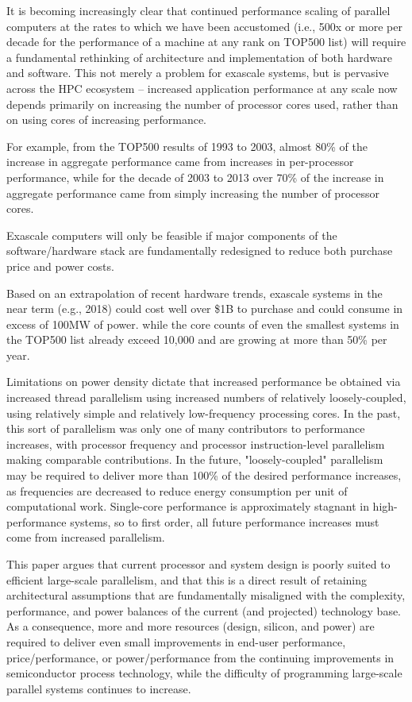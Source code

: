 It is becoming increasingly clear that continued performance scaling of 
parallel computers at the rates to which we have been accustomed (i.e., 500x or more
per decade for the performance of a machine at any rank on TOP500 list) will
require a fundamental rethinking of architecture and implementation of 
both hardware and software.   This not merely a problem for exascale systems,
but is pervasive across the HPC ecosystem -- increased application performance at
any scale now depends primarily on increasing the number of processor cores used,
rather than on using cores of increasing performance.


For example, from the TOP500 results of 1993 to 2003, 
almost 80\% of the increase in aggregate performance came from increases in per-processor 
performance, while for the decade of 2003 to 2013 over 70\% of the increase in aggregate
performance came from simply increasing the number of processor cores.

Exascale computers will only be
feasible if major components of the software/hardware stack are fundamentally
redesigned to reduce both purchase price and power costs.

Based on an extrapolation of recent hardware trends, exascale systems in 
the near term (e.g., 2018) could cost well over \$1B to purchase and could 
consume in excess of 100MW of power.  
while the core counts of even the 
smallest systems in the TOP500 list already exceed 10,000 and are growing
at more than 50\% per year.

Limitations on power density dictate that increased performance be obtained via 
increased thread parallelism %
using increased numbers of relatively loosely-coupled, 
using relatively simple and relatively low-frequency processing cores. 
In the past, this sort of parallelism was only 
one of many contributors to performance increases, with processor frequency
and processor instruction-level parallelism making comparable contributions.
In the future, "loosely-coupled" parallelism may be required to deliver more
than 100\% of the desired performance increases, as frequencies are
decreased to reduce energy consumption per unit of computational work.
Single-core performance is approximately stagnant in high-performance systems, 
so to first order, all future performance increases must come from increased parallelism.


This paper argues that current processor and system design is
poorly suited to efficient large-scale parallelism, and that this is a
direct result of retaining architectural assumptions that are
fundamentally misaligned with the complexity, performance, and power
balances of the current (and projected) technology base.  As a
consequence, more and more resources (design, silicon, and power) are
required to deliver even small improvements in end-user performance,
price/performance, or power/performance from the continuing
improvements in semiconductor process technology, while the difficulty
of programming large-scale parallel systems continues to increase.

